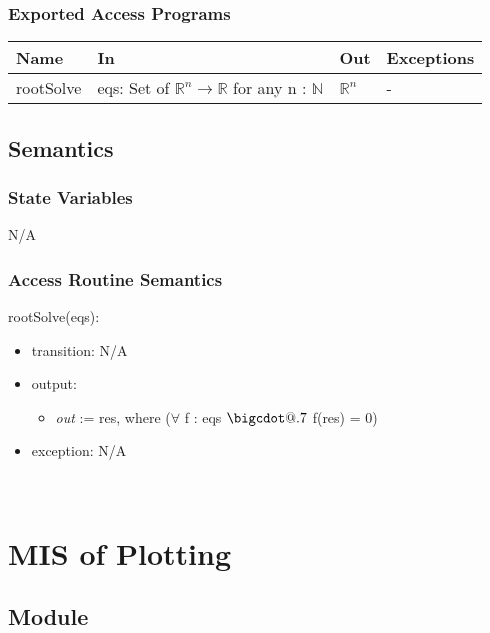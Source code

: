 \documentclass[12pt, titlepage]{article}
\makeatletter
\newcommand*\bigcdot{\mathpalette\bigcdot@{.7}}
\newcommand*\bigcdot@[2]
  {\mathbin{\vcenter{\hbox{\scalebox{#2}{$\m@th#1\bullet$}}}}}
\makeatother
\begin{document}
\subsubsection{Exported Access Programs}

\begin{center}
\begin{tabular}{p{2.8cm} p{3.6cm} p{2.8cm} p{2.8cm}}
\hline
\textbf{Name} & \textbf{In} & \textbf{Out} & \textbf{Exceptions} \\
\hline
rootSolve & eqs: Set of $\mathbb{R}^n \rightarrow \mathbb{R}$ \newline for any n : $\mathbb{N}$ & $\mathbb{R}^n$ & - \\
\hline
\end{tabular}
\end{center}

\subsection{Semantics}

\subsubsection{State Variables}
N/A


\subsubsection{Access Routine Semantics}

\noindent rootSolve(eqs):
\begin{itemize}
\item transition: N/A
\item output: \begin{itemize} 
              \item[] \emph{out} := res, where ($\forall$ f : eqs $\bigcdot$ f(res) = 0)
              \end{itemize}
\item exception: N/A
\end{itemize}


~\newpage

\section{MIS of Plotting} \label{Module:Plotting} 

\subsection{Module}
\end{document}

